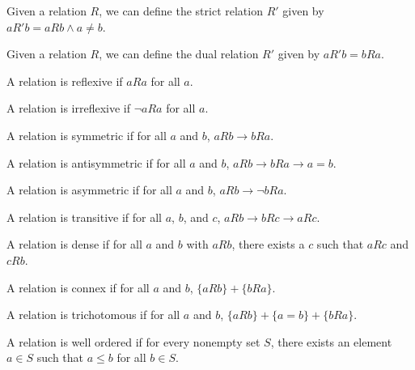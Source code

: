 \documentclass[../../math.tex]{subfiles}
\begin{document}
\begin{definition}
    Given a relation $R$, we can define the strict relation $R'$ given by $aR'b
    = aRb \wedge a \neq b$.
\end{definition}

\begin{definition}
    Given a relation $R$, we can define the dual relation $R'$ given by $aR'b =
    bRa$.
\end{definition}

\begin{class}
    A relation is reflexive if $aRa$ for all $a$.
\end{class}

\begin{class}
    A relation is irreflexive if $\neg aRa$ for all $a$.
\end{class}

\begin{class}
    A relation is symmetric if for all $a$ and $b$, $aRb \rightarrow bRa$.
\end{class}

\begin{class}
    A relation is antisymmetric if for all $a$ and $b$, $aRb \rightarrow bRa
    \rightarrow a = b$.
\end{class}

\begin{class}
    A relation is asymmetric if for all $a$ and $b$, $aRb \rightarrow \neg bRa$.
\end{class}

\begin{class}
    A relation is transitive if for all $a$, $b$, and $c$, $aRb \rightarrow bRc
    \rightarrow aRc$.
\end{class}

\begin{class}
    A relation is dense if for all $a$ and $b$ with $aRb$, there exists a $c$
    such that $aRc$ and $cRb$.
\end{class}

\begin{class}
    A relation is connex if for all $a$ and $b$, $\{aRb\} + \{bRa\}$.
\end{class}

\begin{class}
    A relation is trichotomous if for all $a$ and $b$, $\{aRb\} + \{a = b\} +
    \{bRa\}$.
\end{class}

\begin{class}
    A relation is well ordered if for every nonempty set $S$, there exists an
    element $a \in S$ such that $a \leq b$ for all $b \in S$.
\end{class}
\end{document}
